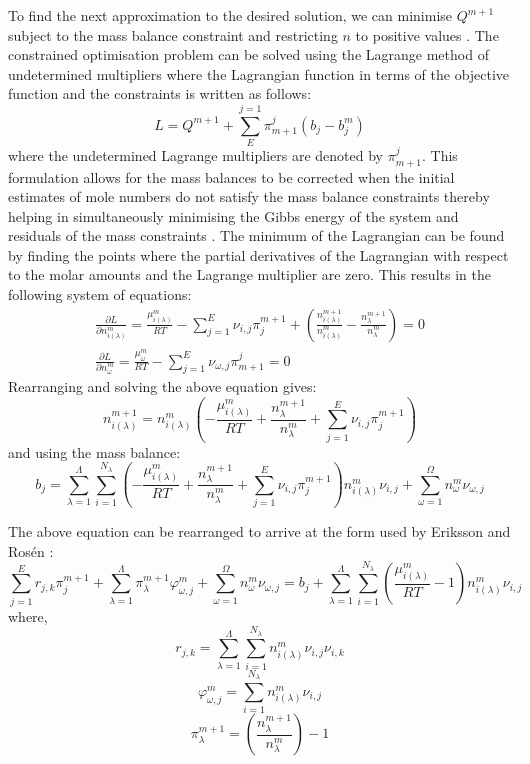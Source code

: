 	 To find the next approximation to the desired solution, we can minimise $Q^{m+1}$ subject to the mass balance constraint and restricting $n$ to positive values \cite{White:58}. The constrained optimisation problem can be solved using the Lagrange method of undetermined multipliers \cite{Nocedal06} where the Lagrangian function in terms of the objective function and the constraints is written as follows:
	 \begin{equation}
	 	L = Q^{m+1} + \sum_{E}^{j=1} \pi_{m+1}^{j}\left( b_j - b_j^{m}\right)
	 \end{equation}
	 where the undetermined Lagrange multipliers are denoted by $\pi_{m+1}^{j}$. This formulation allows for the mass balances to be corrected when the initial estimates of mole numbers do not satisfy the mass balance constraints thereby helping in simultaneously minimising the Gibbs energy of the system and residuals of the mass constraints \cite{Piro11b}. The minimum of the Lagrangian can be found by finding the points where the partial derivatives of the Lagrangian with respect to the molar amounts and the Lagrange multiplier are zero. This results in the following system of equations:
	 \begin{gather}
			\frac{\partial L}{\partial n_{i(\lambda)}^{m}} = \frac{\mu_{i(\lambda)}^{m}}{RT} - \sum_{j=1}^{E} \nu_{i,j} \pi_j^{m+1} + \left(\frac{n_{i(\lambda)}^{m+1}}{n_{i(\lambda)}^{m}} - \frac{n_{\lambda}^{m+1}}{n_{\lambda}^{m}}\right) = 0\\
			\frac{\partial L}{\partial n_{\omega}^{m}} = \frac{\mu_{\omega}^{m}}{RT} - \sum_{j=1}^{E} \nu_{\omega,j}\pi_{m+1}^{j} = 0
	\end{gather}
	Rearranging and solving the above equation gives:
	\begin{equation}
			n_{i(\lambda)}^{m+1} = n_{i(\lambda)}^{m} \left( -\frac{\mu_{i(\lambda)}^{m}}{RT} +  \frac{n_{\lambda}^{m+1}}{n_{\lambda}^{m}} + \sum_{j=1}^{E} \nu_{i,j} \pi_j^{m+1} \right)
	\end{equation}
	 and using the mass balance:
	 \begin{equation}
			b_j = \sum_{\lambda=1}^{\Lambda} \sum_{i=1}^{N_\lambda} \left( -\frac{\mu_{i(\lambda)}^{m}}{RT} +  \frac{n_{\lambda}^{m+1}}{n_{\lambda}^{m}} + \sum_{j=1}^{E} \nu_{i,j} \pi_j^{m+1} \right)n_{i(\lambda)}^{m} \nu_{i,j} + \sum_{\omega=1}^{\Omega}n_{\omega}^{m} \nu_{\omega,j}
	\end{equation}

	The above equation can be rearranged to arrive at the form used by Eriksson and Ros\'en \cite{Eriksson73}:
	\begin{equation}\label{eq:GEM1}
		\sum_{j=1}^{E} r_{j,k}\pi_{j}^{m+1} + \sum_{\lambda=1}^{\Lambda}\pi_{\lambda}^{m+1} \varphi_{\omega,j}^{m} + \sum_{\omega=1}^{\Omega}n_{\omega}^{m} \nu_{\omega,j}
		= b_j + \sum_{\lambda=1}^{\Lambda} \sum_{i=1}^{N_\lambda} \left( \frac{\mu_{i(\lambda)}^{m}}{RT} -1 \right)n_{i(\lambda)}^{m} \nu_{i,j}
	\end{equation}
	where, $$r_{j,k} = \sum_{\lambda=1}^{\Lambda} \sum_{i=1}^{N_\lambda} n_{i(\lambda)}^{m} \nu_{i,j}\nu_{i,k}$$ $$\varphi_{\omega,j}^{m} = \sum_{i=1}^{N_\lambda} n_{i(\lambda)}^{m} \nu_{i,j}$$ $$\pi_{\lambda}^{m+1} = \left(\frac{n_{\lambda}^{m+1}}{n_{\lambda}^{m}}\right) -1$$

